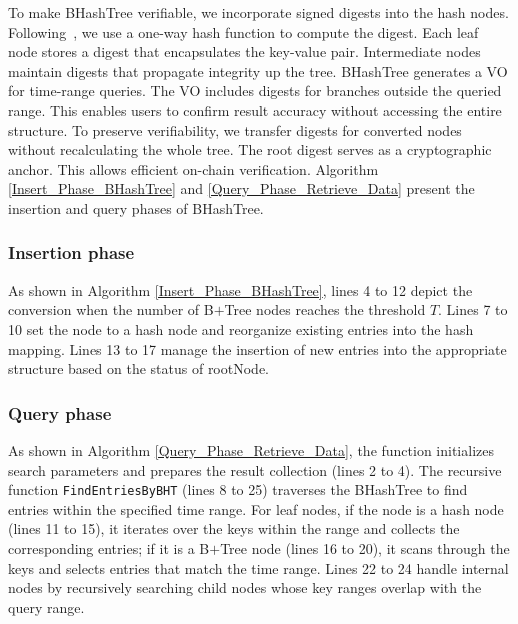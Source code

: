 To make BHashTree verifiable, we incorporate signed digests into the hash nodes. 
Following~\cite{pang2004authenticating}, we use a one-way hash function to compute the digest. 
Each leaf node stores a digest that encapsulates the key-value pair. 
Intermediate nodes maintain digests that propagate integrity up the tree. 
BHashTree generates a VO for time-range queries.
The VO includes digests for branches outside the queried range. 
This enables users to confirm result accuracy without accessing the entire structure. 
To preserve verifiability, we transfer digests for converted nodes without recalculating the whole tree. 
The root digest serves as a cryptographic anchor.
This allows efficient on-chain verification.
Algorithm \ref{Insert_Phase_BHashTree} and \ref{Query_Phase_Retrieve_Data} present the insertion and query phases of BHashTree. 


\subsubsection{Insertion phase}
As shown in Algorithm \ref{Insert_Phase_BHashTree}, lines 4 to 12 depict the conversion when the number of B\(+\)Tree nodes reaches the threshold $T$. 
Lines 7 to 10 set the node to a hash node and reorganize existing entries into the hash mapping. 
Lines 13 to 17 manage the insertion of new entries into the appropriate structure based on the status of rootNode.


\subsubsection{Query phase}
As shown in Algorithm \ref{Query_Phase_Retrieve_Data},
the function initializes search parameters and prepares the result collection (lines 2 to 4). 
The recursive function \texttt{FindEntriesByBHT} (lines 8 to 25) traverses the BHashTree to find entries within the specified time range. 
For leaf nodes, if the node is a hash node (lines 11 to 15), it iterates over the keys within the range and collects the corresponding entries; 
if it is a B\(+\)Tree node (lines 16 to 20), it scans through the keys and selects entries that match the time range.
Lines 22 to 24 handle internal nodes by recursively searching child nodes whose key ranges overlap with the query range.


